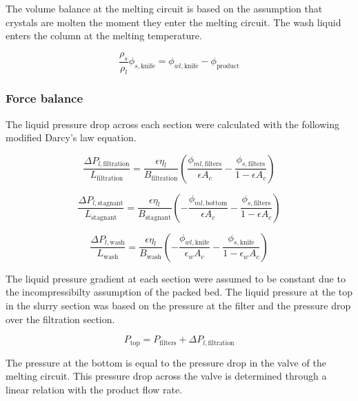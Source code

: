 The volume balance at the melting circuit is based on the assumption that crystals are molten the moment they enter the melting circuit. The wash liquid enters the column at the melting temperature. 

\begin{equation}
\frac{\rho_s}{\rho_l}\phi_{s,\mathrm{knife}}= \phi_{wl,\mathrm{knife}} - \phi_{\mathrm{product}}
\end{equation}


\subsubsection{Force balance}
The liquid pressure drop across each section were calculated with the following modified Darcy's law equation. 

\begin{equation}
\frac{\Delta P_{l,\mathrm{filtration}}}{L_{\mathrm{filtration}}}=\frac{\epsilon \eta_{l}}{B_{\mathrm{filtration}}}\left(\frac{\phi_{ml,\mathrm{filters}}}{\epsilon A_c} - \frac{\phi_{s,\mathrm{filters}}}{1-\epsilon A_c}\right)
\end{equation}

\begin{equation}
\frac{\Delta P_{l,\mathrm{stagnant}}}{L_{\mathrm{stagnant}}}=\frac{\epsilon \eta_{l}}{B_{\mathrm{stagnant}}}\left(-\frac{\phi_{ml,\mathrm{bottom}}}{\epsilon A_c} - \frac{\phi_{s,\mathrm{filters}}}{1-\epsilon A_c}\right)
\end{equation}

\begin{equation}
\frac{\Delta P_{l,\mathrm{wash}}}{L_{\mathrm{wash}}}=\frac{\epsilon \eta_{l}}{B_{\mathrm{wash}}}\left(-\frac{\phi_{wl,\mathrm{knife}}}{\epsilon_w A_c} - \frac{\phi_{s,\mathrm{knife}}}{1-\epsilon_w A_c}\right)
\end{equation}

The liquid pressure gradient at each section were assumed to be constant due to the incompressibilty assumption of the packed bed. The liquid pressure at the top in the slurry section was based on the pressure at the filter and the pressure drop over the filtration section. 

\begin{equation}
P_{\mathrm{top}} = P_{\mathrm{filters}} + \Delta P_{l,\mathrm{filtration}}
\end{equation}


The pressure at the bottom is equal to the pressure drop in the valve of the melting circuit. This pressure drop across the valve is determined through a linear relation with the product flow rate.

